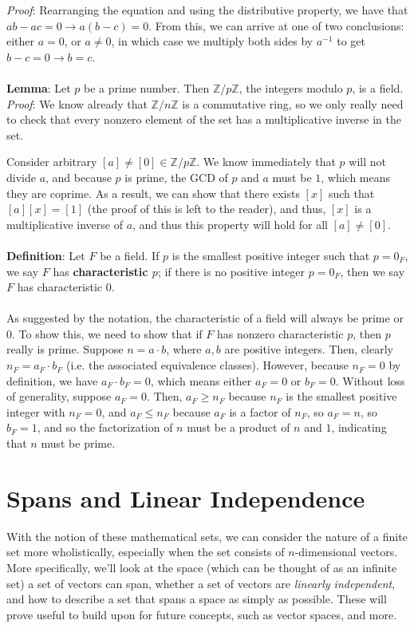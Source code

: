 \documentclass[11pt]{report}
\newcommand{\Z}{\mathbb{Z}}
\begin{document}
\textit{Proof}: Rearranging the equation and using the distributive property, we have that $ab - ac = 0 \rightarrow a(b-c) = 0$. From this, we can arrive at one of two conclusions: either $a = 0$, or $a \ne 0$, in which case we multiply both sides by $a^{-1}$ to get $b - c = 0 \rightarrow b = c$.
\\ \\
\textbf{Lemma}: Let $p$ be a prime number. Then $\Z/p\Z$, the integers modulo $p$, is a field. \\
\textit{Proof}: We know already that $\Z/n\Z$ is a commutative ring, so we only really need to check that every nonzero element of the set has a multiplicative inverse in the set. 

Consider arbitrary $[a] \ne [0] \in \Z/p\Z$. We know immediately that $p$ will not divide $a$, and because $p$ is prime, the GCD of $p$ and $a$ must be $1$, which means they are coprime. As a result, we can show that there exists $[x]$ such that $[a][x] = [1]$ (the proof of this is left to the reader), and thus, $[x]$ is a multiplicative inverse of $a$, and thus this property will hold for all $[a] \ne [0]$.
\\ \\
\textbf{Definition}: Let $F$ be a field. If $p$ is the smallest positive integer such that $p = 0_F$, we say $F$ has \textbf{characteristic $p$}; if there is no positive integer $p = 0_F$, then we say $F$ has characteristic $0$.
\\ \\
As suggested by the notation, the characteristic of a field will always be prime or $0$. To show this, we need to show that if $F$ has nonzero characteristic $p$, then $p$ really is prime. Suppose $n = a \cdot b$, where $a,b$ are positive integers. Then, clearly $n_F = a_F \cdot b_F$ (i.e. the associated equivalence classes). However, because $n_F = 0$ by definition, we have $a_F \cdot b_F = 0$, which means either $a_F = 0$ or $b_F = 0$. Without loss of generality, suppose $a_F = 0$. Then, $a_F \ge n_F$ because $n_F$ is the smallest positive integer with $n_F = 0$, and $a_F \le n_F$ because $a_F$ is a factor of $n_F$, so $a_F = n$, so $b_F = 1$, and so the factorization of $n$ must be a product of $n$ and $1$, indicating that $n$ must be prime.

\chapter{Spans and Linear Independence}
With the notion of these mathematical sets, we can consider the nature of a finite set more wholistically, especially when the set consists of $n$-dimensional vectors. More specifically, we'll look at the space (which can be thought of as an infinite set) a set of vectors can span, whether a set of vectors are \textit{linearly independent}, and how to describe a set that spans a space as simply as possible. These will prove useful to build upon for future concepts, such as vector spaces, and more.
\end{document}
